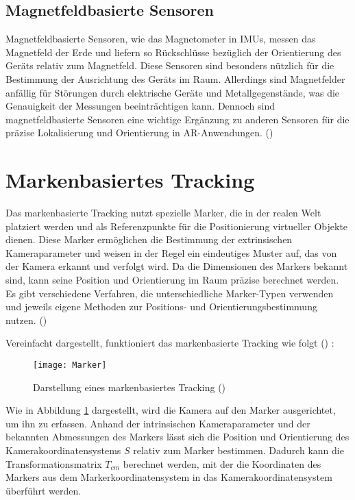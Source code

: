 \subsection{Magnetfeldbasierte Sensoren}

Magnetfeldbasierte Sensoren, wie das Magnetometer in IMUs, messen das Magnetfeld der Erde und liefern so Rückschlüsse bezüglich der Orientierung des Geräts relativ zum Magnetfeld. Diese Sensoren sind besonders nützlich für die Bestimmung der Ausrichtung des Geräts im Raum. Allerdings sind Magnetfelder anfällig für Störungen durch elektrische Geräte und Metallgegenstände, was die Genauigkeit der Messungen beeinträchtigen kann. Dennoch sind magnetfeldbasierte Sensoren eine wichtige Ergänzung zu anderen Sensoren für die präzise Lokalisierung und Orientierung in AR-Anwendungen. (\cite{doerner2022virtual})

\section{Markenbasiertes Tracking}\label{Markerbasiertes Tracking}

Das markenbasierte Tracking nutzt spezielle Marker, die in der realen Welt platziert werden und als Referenzpunkte für die Positionierung virtueller Objekte dienen. Diese Marker ermöglichen die Bestimmung der extrinsischen Kameraparameter und weisen in der Regel ein eindeutiges Muster auf, das von der Kamera erkannt und verfolgt wird. Da die Dimensionen des Markers bekannt sind, kann seine Position und Orientierung im Raum präzise berechnet werden. Es gibt verschiedene Verfahren, die unterschiedliche Marker-Typen verwenden und jeweils eigene Methoden zur Positions- und Orientierungsbestimmung nutzen. (\cite{doerner2022virtual}) 

Vereinfacht dargestellt, funktioniert das markenbasierte Tracking wie folgt (\cite{doerner2022virtual}) :

\begin{figure}
    \centering
    \texttt{[image: Marker]}
    \caption{Darstellung eines markenbasiertes Tracking (\cite{doerner2022virtual}) \label{fig:Marker}}\par
\end{figure}

Wie in Abbildung \ref{fig:Marker} dargestellt, wird die Kamera auf den Marker ausgerichtet, um ihn zu erfassen. Anhand der intrinsischen Kameraparameter und der bekannten Abmessungen des Markers lässt sich die Position und Orientierung des Kamerakoordinatensystems \( S \) relativ zum Marker bestimmen. Dadurch kann die Transformationsmatrix \( T_{cm} \) berechnet werden, mit der die Koordinaten des Markers aus dem Markerkoordinatensystem in das Kamerakoordinatensystem überführt werden. 


